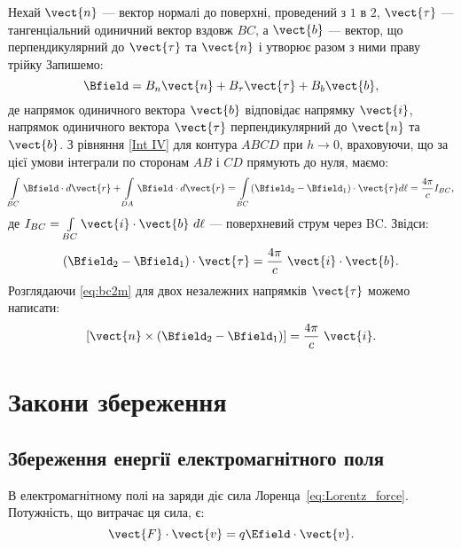 Нехай $\vect{n}$ --- вектор нормалі до поверхні, проведений з $1$ в $2$,  $\vect{\tau}$ --- тангенціальний одиничний вектор вздовж $BC$, а $\vect{b}$
--- вектор, що перпендикулярний до $\vect{\tau}$ та $\vect{n}$ і утворює разом з ними праву трійку
Запишемо:
\begin{equation*}
    \Bfield = B_n\vect{n} + B_{\tau}\vect{\tau} + B_b\vect{b},
\end{equation*}
де напрямок одиничного вектора $\vect{b}$ відповідає напрямку $\vect{i}$, напрямок
одиничного вектора $\vect{\tau}$ перпендикулярний до $\vect{n}$ та $\vect{b}$.
З рівняння \eqref {Int IV} для контура $ABCD$ при $h \to 0$, враховуючи, що за цієї
умови інтеграли по сторонам $AB$ і $CD$ прямують до нуля, маємо:
\begin{equation*}
    \int\limits_{BC} \Bfield\cdot d\vect{r} + \int\limits_{DA} \Bfield\cdot d\vect{r} = \int\limits_{BC} (\Bfield_2 - \Bfield_1)\cdot\vect{\tau} d\ell =
    \frac{4\pi}c I_{BC},
\end{equation*}
де $I_{BC} = \int\limits_{BC} \vect{i}\cdot\vect{b}\ d\ell$ --- поверхневий струм через BC. Звідси:
\begin{equation}\label{eq:bc2m}
    (\Bfield_2 - \Bfield_1)\cdot\vect{\tau} = \frac{4\pi}c\ \vect{i}\cdot\vect{b}.
\end{equation}
Розглядаючи \eqref{eq:bc2m} для двох незалежних напрямків $\vect{\tau}$ можемо написати:
\begin{equation}\label{eq:bc2m2}
    \left[ \vect{n}\times(\Bfield_2 - \Bfield_1)\right]  = \frac{4\pi}c\ \vect{i}.
\end{equation}



\section{Закони збереження}




\subsection*{Збереження енергії електромагнітного поля}


В електромагнітному полі на заряди діє сила Лоренца~\eqref{eq:Lorentz_force}. Потужність,
що витрачає ця сила, є:
\begin{equation*}
    \vect{F}\cdot\vect{v} = q\Efield\cdot\vect{v}.
\end{equation*}

